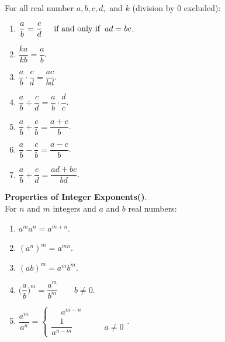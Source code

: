 \documentclass{rmutt-seminar}
\begin{document}
\begin{theorem}
	\textnormal{For all real number} $a, b, c, d,$ \textnormal{and} $k$ \textnormal{(division by 0 excluded)}:
\begin{enumerate} 
	\item $\dfrac{a}{b} = \dfrac{c}{d} \hspace*{0.5cm} \textnormal{if and only if} \hspace*{0.2cm} ad = bc$.
	\item $\dfrac{ka}{kb} = \dfrac{a}{b}$.
	\item $\dfrac{a}{b} \cdot \dfrac{c}{d} = \dfrac{ac}{bd}$.
	\item $\dfrac{a}{b} \div \dfrac{c}{d} = \dfrac{a}{b} \cdot \dfrac{d}{c}$.
	\item $\dfrac{a}{b} + \dfrac{c}{b} = \dfrac{a + c}{b}$.
	\item $\dfrac{a}{b} - \dfrac{c}{b} = \dfrac{a - c}{b}$.
	\item $\dfrac{a}{b} + \dfrac{c}{d} = \dfrac{ad + bc}{bd}$.
\end{enumerate}
\end{theorem}

\begin{theorem}
\textnormal{\textbf{Properties of Integer Exponents(\cite{ARE08})}}.\\[3 mm] \textnormal{For} $n$ \textnormal{and} $m$ \textnormal{integers and} $a$ \textnormal{and} $b$ \textnormal{real numbers:}
\begin{enumerate}
	\item $a^ma^n=a^{m+n}$.
	\item $(a^n)^m=a^{mn}$.
	\item $(ab)^m=a^mb^m$.
	\item $\bigg(\dfrac{a}{b}\bigg)^m =\dfrac{a^m}{b^m} \quad\quad b\neq0$.
	\item $\dfrac{a^m}{a^n} = \begin{cases} \phantom{-} a^{m-n}& 
			 \\ \dfrac{1}{a^{n-m}} &  \quad \quad a \neq 0 \end{cases}$.
\end{enumerate}
\end{theorem}
\end{document}

